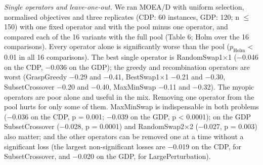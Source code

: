 \emph{Single operators and leave-one-out.} We ran MOEA/D with uniform selection, normalised objectives and three replicates (CDP: 60 instances, GDP: 120; n $\leq$ 150) with one fixed operator and with the pool minus one operator, and compared each of the 16 variants with the full pool (Table 6; Holm over the 16 comparisons). Every operator alone is significantly worse than the pool ($p_{\mathrm{Holm}}$ < 0.01 in all 16 comparisons). The best single operator is RandomSwap1$\times$1 ($-$0.046 on the CDP, $-$0.036 on the GDP); the greedy and recombination operators are worst (GraspGreedy $-$0.29 and $-$0.41, BestSwap1$\times$1 $-$0.21 and $-$0.30, SubsetCrossover $-$0.20 and $-$0.40, MaxMinSwap $-$0.11 and $-$0.32). The myopic operators are poor alone and useful in the mix. Removing one operator from the pool hurts for only some of them. MaxMinSwap is indispensable in both problems ($-$0.036 on the CDP, p = 0.001; $-$0.039 on the GDP, p < 0.0001); on the GDP SubsetCrossover ($-$0.028, p = 0.0001) and RandomSwap2$\times$2 ($-$0.027, p = 0.003) also matter; and the other operators can be removed one at a time without a significant loss (the largest non-significant losses are $-$0.019 on the CDP, for SubsetCrossover, and $-$0.020 on the GDP, for LargePerturbation).

